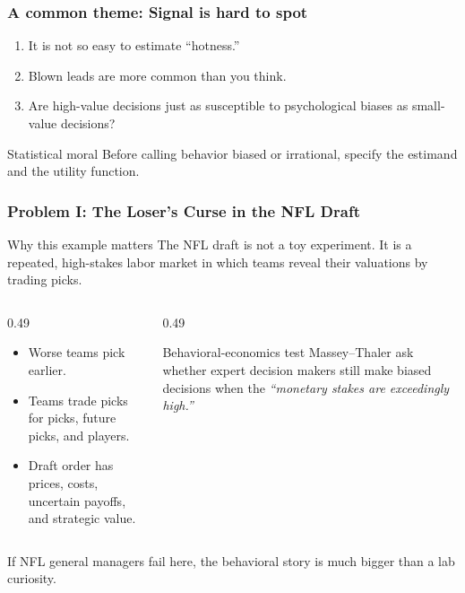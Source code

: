 \documentclass[aspectratio=169,professionalfonts]{beamer}
\newcommand{\slidecite}[1]{\vspace{0.5mm}{\scriptsize\hfill #1}}
\begin{document}
\begin{frame}
\frametitle{A common theme: Signal is hard to spot}


\large
\begin{enumerate}
\item It is not so easy to estimate ``hotness.''
\item Blown leads are more common than you think. \\[1mm]
\item Are high-value decisions just as susceptible to psychological biases as small-value decisions?
\end{enumerate}


\vspace{5mm}
\begin{block}{Statistical moral}
Before calling behavior biased or irrational, specify the estimand and the utility function.
\end{block}
\end{frame}

\begin{frame}
\frametitle{Problem I: The Loser's Curse in the NFL Draft}
\begin{block}{Why this example matters}
The NFL draft is not a toy experiment. It is a repeated, high-stakes labor market in which teams reveal their valuations by trading picks.
\end{block}

\begin{columns}[T,totalwidth=\textwidth]
\begin{column}{0.49\textwidth}
\begin{itemize}
  \item Worse teams pick earlier.
  \item Teams trade picks for picks, future picks, and players.
  \item Draft order has prices, costs, uncertain payoffs, and strategic value.
\end{itemize}
\end{column}
\begin{column}{0.49\textwidth}
\begin{block}{Behavioral-economics test}
Massey--Thaler ask whether expert decision makers still make biased decisions when the \emph{``monetary stakes are exceedingly high.''}
\slidecite{Massey and Thaler (2013)}
\end{block}
\end{column}
\end{columns}

\vspace{2mm}
\centering
\alert{If NFL general managers fail here, the behavioral story is much bigger than a lab curiosity.}
\end{frame}
\end{document}
